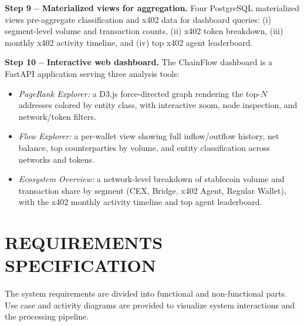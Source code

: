 \documentclass[a4paper,12pt]{report}
\begin{document}
\textbf{Step 9 -- Materialized views for aggregation.}
Four PostgreSQL materialized views pre-aggregate classification and x402 data for dashboard
queries: (i) segment-level volume and transaction counts, (ii) x402 token breakdown,
(iii) monthly x402 activity timeline, and (iv) top x402 agent leaderboard.

\textbf{Step 10 -- Interactive web dashboard.}
The ChainFlow dashboard is a FastAPI application serving three analysis tools:
\begin{itemize}
    \item \textit{PageRank Explorer:} a D3.js force-directed graph rendering the top-$N$ addresses
    colored by entity class, with interactive zoom, node inspection, and network/token filters.
    \item \textit{Flow Explorer:} a per-wallet view showing full inflow/outflow history, net balance,
    top counterparties by volume, and entity classification across networks and tokens.
    \item \textit{Ecosystem Overview:} a network-level breakdown of stablecoin volume and transaction
    share by segment (CEX, Bridge, x402 Agent, Regular Wallet), with the x402 monthly activity
    timeline and top agent leaderboard.
\end{itemize}

\chapter{REQUIREMENTS SPECIFICATION}

The system requirements are divided into functional and non-functional parts. Use case and
activity diagrams are provided to visualize system interactions and the processing pipeline.
\end{document}
